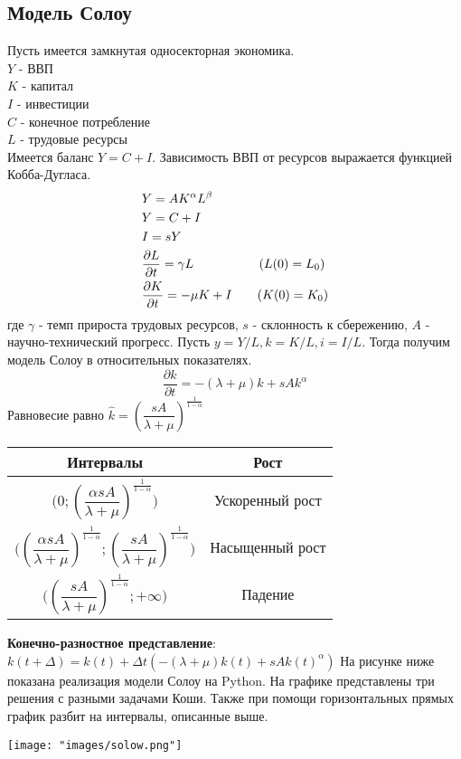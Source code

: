 \subsection{Модель Солоу}
Пусть имеется замкнутая односекторная экономика.\\
$Y$ - ВВП\\
$K$ - капитал\\
$I$ - инвестиции\\
$C$ - конечное потребление\\
$L$ - трудовые ресурсы\\
Имеется баланс $Y=C+I$. Зависимость ВВП от ресурсов выражается функцией Кобба-Дугласа.
\begin{align}
  &Y=AK^{\alpha}L^{\beta}\notag\\
  &Y=C+I\notag\\
  &I=sY\\
  &\dfrac{\partial L}{\partial t}=\gamma L \qquad \qquad\quad\,(L(0)=L_0)\notag\\
  &\dfrac{\partial K}{\partial t}=-\mu K+I \qquad(K(0)=K_0)\notag
\end{align}
где $ \gamma$ - темп прироста трудовых ресурсов, $s$ - склонность к сбережению, $A$ - научно-технический прогресс.
Пусть $y=Y/L,k=K/L,i=I/L$. Тогда получим модель Солоу в относительных показателях.
\begin{equation}
  \frac{\partial k}{\partial t}=-(\lambda+\mu)k+sAk^{\alpha}
\end{equation}
Равновесие равно $\hat{k}=(\dfrac{sA}{\lambda+\mu})^{\frac{1}{1-\alpha}}$
\begin{center}
\begin{tabular}{|c|c|}
  \hline
  Интервалы&Рост\\
  \hline
  $\bigg(0;(\dfrac{\alpha sA}{\lambda+\mu})^{\frac{1}{1-\alpha}}\bigg)$&Ускоренный рост\\
  \hline
  $\bigg((\dfrac{\alpha sA}{\lambda+\mu})^{\frac{1}{1-\alpha}};(\dfrac{sA}{\lambda+\mu})^{\frac{1}{1-\alpha}}\bigg)$&Насыщенный рост\\
  \hline
  $\bigg((\dfrac{sA}{\lambda+\mu})^{\frac{1}{1-\alpha}};+\infty\bigg)$&Падение\\
  \hline
\end{tabular}
\end{center}
\textbf{Конечно-разностное представление}:
$k(t+\Delta)=k(t)+\Delta t(-(\lambda+\mu)k(t)+sAk(t)^{\alpha})$
На рисунке ниже показана реализация модели Солоу на Python. На графике представлены три решения с разными задачами Коши. Также при помощи горизонтальных прямых график разбит на интервалы, описанные выше.
\begin{center}
  \texttt{[image: "images/solow.png"]}
\end{center}

